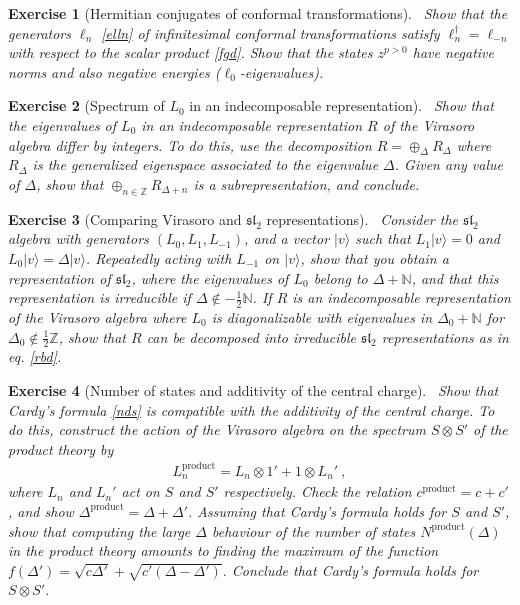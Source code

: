 \documentclass[12pt,a4paper,notitlepage]{report}
\numberwithin{equation}{section}
\theoremstyle{break}
\newtheorem{exo}{Exercise}[chapter]
\begin{document}
\begin{exo}[Hermitian conjugates of conformal transformations]
 ~\label{exolnd}
Show that the generators $\ell_n$ \eqref{elln} of infinitesimal conformal transformations satisfy $\ell_n^\dagger =\ell_{-n}$ with respect to the scalar product \eqref{fgd}.
Show that the states $z^{p>0}$ have negative norms and also negative energies ($\ell_0$-eigenvalues). 
\end{exo}

\begin{exo}[Spectrum of $L_0$ in an indecomposable representation]
 ~\label{exodiffint}
Show that the eigenvalues of $L_0$ in an indecomposable representation $R$ of the Virasoro algebra differ by integers.
To do this, use the decomposition $R=\oplus_\Delta R_\Delta$ where $R_\Delta$ is the generalized eigenspace associated to the eigenvalue $\Delta$.
Given any value of $\Delta$, show that  $\oplus_{n\in{\mathbb{Z}}} R_{\Delta+n}$ is a subrepresentation, and conclude. 
\end{exo}

\begin{exo}[Comparing Virasoro and $\mathfrak{sl}_2$ representations]
 ~\label{exodis}
Consider the $\mathfrak{sl}_2$ algebra with generators $(L_0,L_1,L_{-1})$, and a vector $|v\rangle$ such that $L_1|v\rangle = 0 $ and $L_0|v\rangle = \Delta |v\rangle$.
Repeatedly acting with $L_{-1}$ on $|v\rangle$, show that you obtain a representation of $\mathfrak{sl}_2$, where the eigenvalues of $L_0$ belong to $\Delta+{\mathbb{N}}$, and that this representation is irreducible if $\Delta\notin -\frac12 \mathbb{N}$.
If $R$ is an indecomposable representation of the Virasoro algebra where $L_0$ is diagonalizable with eigenvalues in $\Delta_0+\mathbb{N}$ for $\Delta_0\notin\frac12 \mathbb{Z}$, show that $R$ can be decomposed into irreducible $\mathfrak{sl}_2$ representations as in eq. \eqref{rbd}.
\end{exo}


\begin{exo}[Number of states and additivity of the central charge]
 ~\label{exoacf} 
Show that Cardy's formula \eqref{nds} is compatible with the additivity of the central charge.
To do this, construct the action of the Virasoro algebra on the spectrum $S\otimes S'$ of the product theory by 
\begin{align}
 L_n^\text{product} = L_n\otimes 1' + 1\otimes L_n'\ ,
\end{align}
where $L_n$ and $L_n'$ act on $S$ and $S'$ respectively.
Check the relation $c^\text{product} = c+c'$, and show $\Delta^\text{product} = \Delta+\Delta'$.
Assuming that Cardy's formula holds for $S$ and $S'$, show that computing the large $\Delta$ behaviour of the number of states $N^\text{product}(\Delta)$ in the product theory amounts to finding the maximum of the function $f(\Delta') = \sqrt{c\Delta'} +\sqrt{c'(\Delta-\Delta')}$.
Conclude that Cardy's formula holds for $S\otimes S'$.
\end{exo}
\end{document}
